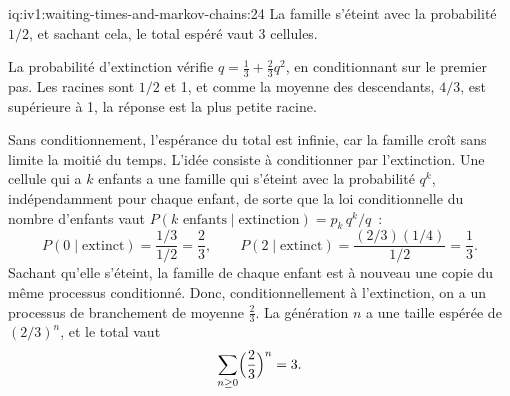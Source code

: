\begin{solution}{iq:iv1:waiting-times-and-markov-chains:24}
La famille s'éteint avec la probabilité $1/2$, et sachant cela, le total espéré vaut 3 cellules.

La probabilité d'extinction vérifie $q = \tfrac13 + \tfrac23 q^2$, en conditionnant sur le premier pas. Les racines sont $1/2$ et 1, et comme la moyenne des descendants, $4/3$, est supérieure à 1, la réponse est la plus petite racine.

Sans conditionnement, l'espérance du total est infinie, car la famille croît sans limite la moitié du temps. L'idée consiste à conditionner par l'extinction. Une cellule qui a $k$ enfants a une famille qui s'éteint avec la probabilité $q^k$, indépendamment pour chaque enfant, de sorte que la loi conditionnelle du nombre d'enfants vaut $P(k \text{ enfants} \mid \text{extinction}) = p_k\,q^k / q$~:
\[
P(0 \mid \text{extinct}) = \frac{1/3}{1/2} = \frac23, \qquad P(2 \mid \text{extinct}) = \frac{(2/3)(1/4)}{1/2} = \frac13.
\]
Sachant qu'elle s'éteint, la famille de chaque enfant est à nouveau une copie du même processus conditionné. Donc, conditionnellement à l'extinction, on a un processus de branchement de moyenne $\tfrac23$. La génération $n$ a une taille espérée de $(2/3)^n$, et le total vaut
\[
\sum_{n \ge 0} \Bigl(\frac23\Bigr)^n = 3.
\]
\end{solution}

